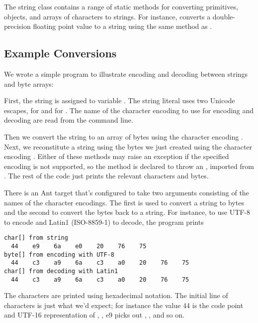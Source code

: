 The string class contains a range of static 
methods for converting primitives, objects, and arrays of characters
to strings.  For instance,  converts a
double-precision floating point value to a string using the same
method as .

\subsection{Example Conversions}

We wrote a simple program to illustrate encoding and decoding between
strings and byte arrays:
%

%
%
First, the string  is
assigned to variable
.  The string literal uses two Unicode escapes, 
 for  and  for 
.  The name of the character encoding to use for
encoding and decoding are read from the command line.  

Then we convert the string  to an array of bytes
 using the character encoding .  Next, we
reconstitute a string using the bytes we just created using the
character encoding .  Either of these methods may raise
an exception if the specified encoding is not supported, so the 
 method is declared to throw an
, imported from .
The rest of the code just prints the relevant characters and bytes.

There is an Ant target  that's configured to take
two arguments consisting of the names of the character encodings.  The
first is used to convert a string to bytes and the second to convert
the bytes back to a string.  For instance, to use UTF-8 to encode and
Latin1 (ISO-8859-1) to decode, the program prints 
%
\begin{verbatim}
char[] from string
  44    e9    6a    e0    20    76    75
byte[] from encoding with UTF-8
  44    c3    a9    6a    c3    a0    20    76    75
char[] from decoding with Latin1
  44    c3    a9    6a    c3    a0    20    76    75
\end{verbatim}
%
The characters are printed using hexadecimal notation.  The initial
line of characters is just what we'd expect; for instance the
 value 44 is the code point and UTF-16 representation of
, ,  e9
picks out , , and so on.

